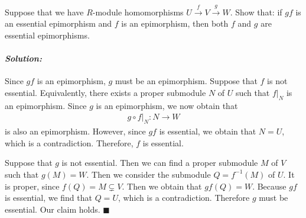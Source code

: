 \documentclass[12pt, a4paper]{article}
\theoremstyle{remark}
\newenvironment{solution}
  {\paragraph{\textit{Solution:}}\par\medskip}
  {\hfill$\blacksquare$\vspace{0.1cm}}
\begin{document}
Suppose that we have $R$-module homomorphisms $U \xrightarrow{f} V \xrightarrow{g} W$. Show that: if $gf$ is an essential epimorphism and $f$ is an epimorphism, then both $f$ and $g$ are essential epimorphisms.
\begin{solution}
    Since $gf$ is an epimorphism, $g$ must be an epimorphism. Suppose that $f$ is not essential. Equivalently, there exists a proper submodule $N$ of $U$ such that $f|_{N}$ is an epimorphism. Since $g$ is an epimorphism, we now obtain that 
    \begin{align*}
        g \circ f|_N: N\to W 
    \end{align*}  
    is also an epimorphism. However, since $gf$ is essential, we obtain that $N=U$, which is a contradiction.
    Therefore, $f$ is essential. 

    Suppose that $g$ is not essential. Then we can find a proper submodule $M$ of $V$ such that $g(M)=W$.
    Then we consider the submodule $Q = f^{-1}(M)$ of $U$. It is proper, since $f(Q)=M\subsetneq V$. 
    Then we obtain that $gf(Q)=W$. Because $gf$ is essential, we find that $Q=U$, which is a contradiction. Therefore $g$ must be essential.
    Our claim holds.
\end{solution}
\end{document}
